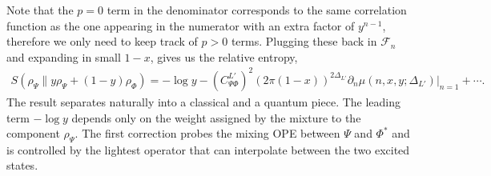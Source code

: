 \documentclass[11pt]{article}
\newcommand{\p}{\partial}
\newcommand{\nn}{\nonumber}
\newcommand{\lb}{\left(}
\newcommand{\rb}{\right)}
\begin{document}
Note that the $p=0$ term in the denominator corresponds to the same correlation function as the one appearing in the numerator with an extra factor of $y^{n-1}$, therefore we only need to keep track of $p>0$ terms. Plugging these back in $\mathcal{F}_n$ and expanding in small $1-x$,
gives us the relative entropy,
\begin{align}
    S(\rho_\Psi \| y\rho_\Psi + (1-y)\rho_\Phi)=-\log y - {(C_{\Psi\Phi}^{L'})}^2(2\pi (1-x))^{2\Delta_{L'}}\p_n\mu(n,x,y;\Delta_{L'})|_{n=1}+\cdots.
\end{align}
The result separates naturally into a classical and a quantum piece. The
leading term $-\log y$ depends only on the weight assigned by the mixture
to the component $\rho_\Psi$. The first correction probes the mixing OPE
between $\Psi$ and $\Phi^*$ and is controlled by the lightest operator
that can interpolate between the two excited states.
\end{document}
